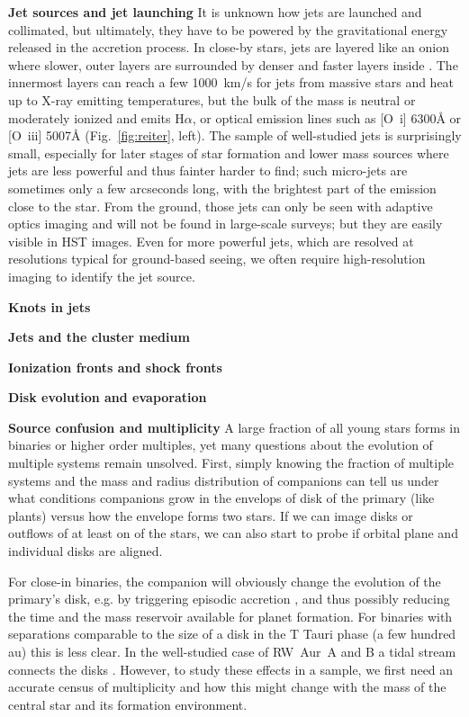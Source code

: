 \documentclass[12pt]{article}
\begin{document}
\textbf{Jet sources and jet launching}
It is unknown how jets are launched and collimated, but ultimately, they have to be powered by the gravitational energy released in the accretion process. In close-by stars, jets are layered like an onion where slower, outer layers are surrounded by denser and faster layers inside \citep{2000ApJ...537L..49B}. The innermost layers can reach a few 1000~km/s for jets from massive stars and heat up to X-ray emitting temperatures, but the bulk of the mass is neutral or moderately ionized and emits H$\alpha$, or optical emission lines such as [O~{\sc i}] 6300\AA{} or [O~{\sc iii}] 5007\AA{} (Fig.~\ref{fig:reiter}, left). The sample of well-studied jets is surprisingly small, especially for later stages of star formation and lower mass sources where jets are less powerful and thus fainter harder to find; such micro-jets are sometimes only a few arcseconds long, with the brightest part of the emission close to the star. From the ground, those jets can only be seen with adaptive optics imaging and will not be found in large-scale surveys; but they are easily visible in HST images. Even for more powerful jets, which are resolved at resolutions typical for ground-based seeing, we often require high-resolution imaging to identify the jet source.

\textbf{Knots in jets}



\textbf{Jets and the cluster medium}

\textbf{Ionization fronts and shock fronts}

\textbf{Disk evolution and evaporation}

\textbf{Source confusion and multiplicity}
A large fraction of all young stars forms in binaries or higher order multiples, yet many questions about the evolution of multiple systems remain unsolved. First, simply knowing the fraction of multiple systems and the mass and radius distribution of companions can tell us under what conditions companions grow in the envelops of disk of the primary (like plants) versus how the envelope forms two stars. If we can image disks or outflows of at least on of the stars, we can also start to probe if orbital plane and individual disks are aligned.

For close-in binaries, the companion will obviously change the evolution of the primary's disk, e.g. by triggering episodic accretion \citep{2013ApJ...766...62G }, and thus possibly reducing the time and the mass reservoir available for planet formation. For binaries with separations comparable to the size of a disk in the T Tauri phase (a few hundred au) this is less clear. In the well-studied case of RW~Aur~A and B a tidal stream connects the disks \citep{2006A&A...452..897C}. However, to study these effects in a sample, we first need an accurate census of multiplicity and how this might change with the mass of the central star and its formation environment.
\end{document}

